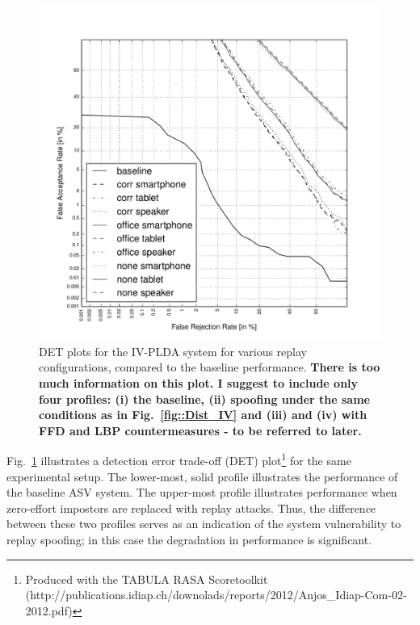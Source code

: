 \begin{figure}[!t]
	\centering
	\includegraphics[width=1\linewidth]{Figs/DETs_IV.pdf}
	\caption{DET plots for the IV-PLDA system for various replay configurations, compared to the baseline performance. {\bfseries There is too much information on this plot.  I suggest to include only four profiles: (i) the baseline, (ii) spoofing under the same conditions as in Fig.~\ref{fig::Dist_IV} and (iii) and (iv) with FFD and LBP countermeasures - to be referred to later.}}
	\label{fig::DETs_replay_IV}
\end{figure}


Fig.~\ref{fig::DETs_replay_IV} illustrates a detection error trade-off (DET) plot\footnote{Produced with the TABULA RASA Scoretoolkit (http://publications.idiap.ch/downolads/reports/2012/Anjos\_Idiap-Com-02-2012.pdf)} for the same experimental setup.  The lower-most, solid profile illustrates the performance of the baseline ASV system.  The upper-most profile illustrates performance when zero-effort impostors are replaced with replay attacks.  Thus, the difference between these two profiles serves as an indication of the system vulnerability to replay spoofing; in this case the degradation in performance is significant.  


